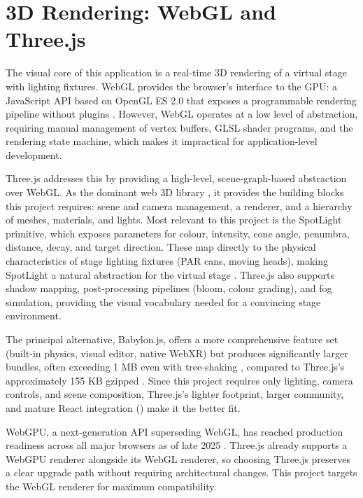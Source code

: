 \section{3D Rendering: WebGL and Three.js}
\label{sec:ch3-3d-rendering}

The visual core of this application is a real-time 3D rendering of a virtual stage with lighting fixtures. WebGL provides the browser's interface to the GPU: a JavaScript API based on OpenGL ES 2.0 that exposes a programmable rendering pipeline without plugins \cite{threejs-docs}. However, WebGL operates at a low level of abstraction, requiring manual management of vertex buffers, GLSL shader programs, and the rendering state machine, which makes it impractical for application-level development.

Three.js addresses this by providing a high-level, scene-graph-based abstraction over WebGL. As the dominant web 3D library \cite{threejs-github,npm-three}, it provides the building blocks this project requires: scene and camera management, a renderer, and a hierarchy of meshes, materials, and lights. Most relevant to this project is the SpotLight primitive, which exposes parameters for colour, intensity, cone angle, penumbra, distance, decay, and target direction. These map directly to the physical characteristics of stage lighting fixtures (PAR cans, moving heads), making SpotLight a natural abstraction for the virtual stage \cite{threejs-docs}. Three.js also supports shadow mapping, post-processing pipelines (bloom, colour grading), and fog simulation, providing the visual vocabulary needed for a convincing stage environment.

The principal alternative, Babylon.js, offers a more comprehensive feature set (built-in physics, visual editor, native WebXR) but produces significantly larger bundles, often exceeding 1 MB even with tree-shaking \cite{babylonjs-forum-bundle-size}, compared to Three.js's approximately 155 KB gzipped \cite{bundlephobia-three}. Since this project requires only lighting, camera controls, and scene composition, Three.js's lighter footprint, larger community, and mature React integration () make it the better fit.

WebGPU, a next-generation API superseding WebGL, has reached production readiness across all major browsers as of late 2025 \cite{webdev-webgpu-major-browsers-2025,gpuweb-implementation-status}. Three.js already supports a WebGPU renderer alongside its WebGL renderer, so choosing Three.js preserves a clear upgrade path without requiring architectural changes. This project targets the WebGL renderer for maximum compatibility.

